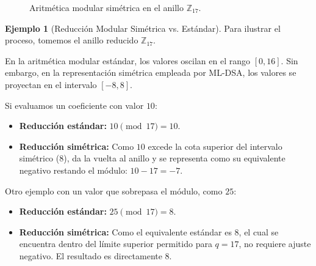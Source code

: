 \documentclass[11pt, a4paper]{report}
\theoremstyle{definition}
\newtheorem{ejemplo}{Ejemplo}[chapter]
\begin{document}
\begin{figure}[H]
    \centering
    \caption{Aritmética modular simétrica en el anillo $\mathbb{Z}_{17}$.}
    \label{fig:modulo_simetrico}
\end{figure}

\begin{ejemplo}[Reducción Modular Simétrica vs. Estándar]
\label{ex:reduccion_simetrica}
Para ilustrar el proceso, tomemos el anillo reducido $\mathbb{Z}_{17}$. 

En la aritmética modular estándar, los valores oscilan en el rango $[0, 16]$. Sin embargo, en la representación simétrica empleada por ML-DSA, los valores se proyectan en el intervalo $[-8, 8]$.

Si evaluamos un coeficiente con valor $10$:
\begin{itemize}
    \item \textbf{Reducción estándar:} $10 \pmod{17} = 10$.
    \item \textbf{Reducción simétrica:} Como $10$ excede la cota superior del intervalo simétrico ($8$), da la vuelta al anillo y se representa como su equivalente negativo restando el módulo: $10 - 17 = -7$.
\end{itemize}

Otro ejemplo con un valor que sobrepasa el módulo, como $25$:
\begin{itemize}
    \item \textbf{Reducción estándar:} $25 \pmod{17} = 8$.
    \item \textbf{Reducción simétrica:} Como el equivalente estándar es $8$, el cual se encuentra dentro del límite superior permitido para $q=17$, no requiere ajuste negativo. El resultado es directamente $8$.
\end{itemize}
\end{ejemplo}
\end{document}
